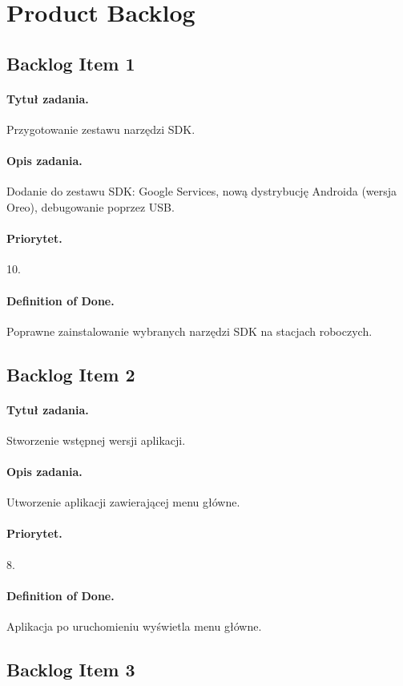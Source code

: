 \documentclass[a4paper]{article}
\begin{document}
\section{Product Backlog}

\subsection{Backlog Item 1}
\paragraph{Tytuł zadania.} Przygotowanie zestawu narzędzi SDK.
\paragraph{Opis zadania.} Dodanie do zestawu SDK: Google Services, nową dystrybucję Androida (wersja Oreo), debugowanie poprzez USB.
\paragraph{Priorytet.} 10.
\paragraph{Definition of Done.} Poprawne zainstalowanie wybranych narzędzi SDK na stacjach roboczych.

\subsection{Backlog Item 2}
\paragraph{Tytuł zadania.} Stworzenie wstępnej wersji aplikacji.
\paragraph{Opis zadania.} Utworzenie aplikacji zawierającej menu główne.
\paragraph{Priorytet.} 8.
\paragraph{Definition of Done.} Aplikacja po uruchomieniu wyświetla menu główne.

\subsection{Backlog Item 3}
\end{document}
